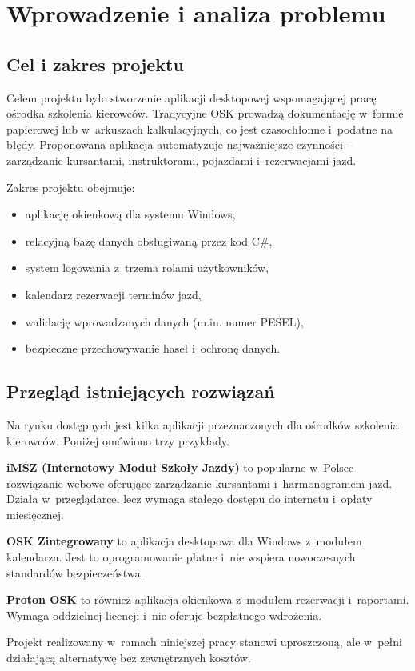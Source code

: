 \chapter{Wprowadzenie i analiza problemu}
\label{ch:wprowadzenie}

\section{Cel i zakres projektu}

Celem projektu by\l{}o stworzenie aplikacji desktopowej wspomagaj\k{a}cej
prac\k{e} o\'{s}rodka szkolenia kierowc\'{o}w. Tradycyjne OSK prowadz\k{a}
dokumentacj\k{e} w~formie papierowej lub w~arkuszach kalkulacyjnych, co jest
czasoch\l{}onne i~podatne na b\l{}\k{e}dy. Proponowana aplikacja automatyzuje
najwa\.{z}niejsze czynno\'{s}ci -- zarz\k{a}dzanie kursantami, instruktorami,
pojazdami i~rezerwacjami jazd.

Zakres projektu obejmuje:
\begin{itemize}
  \item aplikacj\k{e} okienkow\k{a} dla systemu Windows,
  \item relacyjn\k{a} baz\k{e} danych obs\l{}ugiwan\k{a} przez kod C\#,
  \item system logowania z~trzema rolami u\.{z}ytkownik\'{o}w,
  \item kalendarz rezerwacji termin\'{o}w jazd,
  \item walidacj\k{e} wprowadzanych danych (m.in. numer PESEL),
  \item bezpieczne przechowywanie hase\l{} i~ochron\k{e} danych.
\end{itemize}

\section{Przegl\k{a}d istniej\k{a}cych rozwi\k{a}za\'{n}}
\label{sec:przeglad}

Na rynku dost\k{e}pnych jest kilka aplikacji przeznaczonych dla o\'{s}rodk\'{o}w
szkolenia kierowc\'{o}w. Poni\.{z}ej om\'{o}wiono trzy przyk\l{}ady.

\textbf{iMSZ (Internetowy Modu\l{} Szko\l{}y Jazdy)} to popularne w~Polsce
rozwi\k{a}zanie webowe oferuj\k{a}ce zarz\k{a}dzanie kursantami i~harmonogramem
jazd. Dzia\l{}a w~przegl\k{a}darce, lecz wymaga sta\l{}ego dost\k{e}pu do
internetu i~op\l{}aty miesi\k{e}cznej.

\textbf{OSK Zintegrowany} to aplikacja desktopowa dla Windows z~modu\l{}em
kalendarza. Jest to oprogramowanie p\l{}atne i~nie wspiera nowoczesnych
standard\'{o}w bezpiecze\'{n}stwa.

\textbf{Proton OSK} to r\'{o}wnie\.{z} aplikacja okienkowa z~modu\l{}em
rezerwacji i~raportami. Wymaga oddzielnej licencji i~nie oferuje
bezp\l{}atnego wdro\.{z}enia.

Projekt realizowany w~ramach niniejszej pracy stanowi uproszczon\k{a}, ale
w~pe\l{}ni dzia\l{}aj\k{a}c\k{a} alternatyw\k{e} bez zewn\k{e}trznych koszt\'{o}w.
